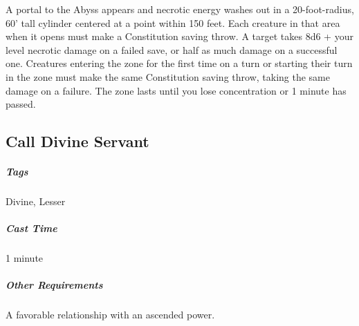A portal to the Abyss appears and necrotic energy washes out in a 20-foot-radius, 60' tall cylinder centered at a point within 150 feet. Each creature in that area when it opens must make a Constitution saving throw. A target takes 8d6 + your level necrotic damage on a failed save, or half as much damage on a successful one. Creatures entering the zone for the first time on a turn or starting their turn in the zone must make the same Constitution saving throw, taking the same damage on a failure. The zone lasts until you lose concentration or 1 minute has passed.










\subsection{Call Divine Servant\label{spell:call-divine-servant}}
\subparagraph*{Tags} Divine, Lesser
\subparagraph*{Cast Time} 1 minute
\subparagraph*{Other Requirements} A favorable relationship with an ascended power.

